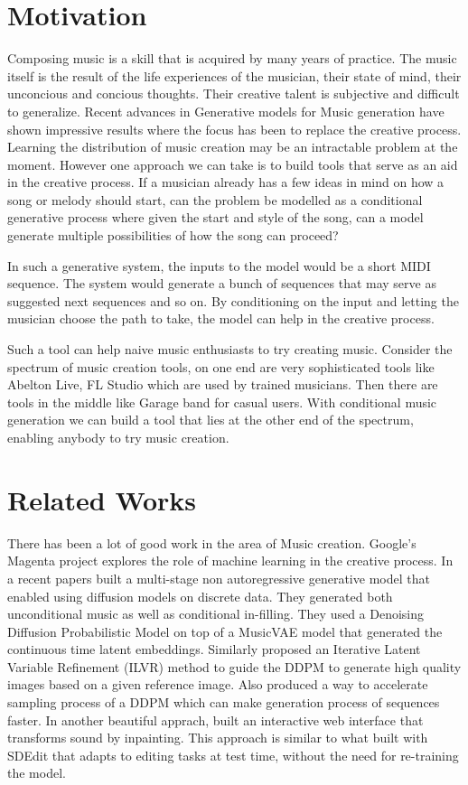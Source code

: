 \documentclass{article}
\begin{document}
\section{Motivation}
\label{submission}
Composing music is a skill that is acquired by many years of practice. The music itself is the result of the life experiences of the musician, their state of mind, their unconcious and concious thoughts. Their creative talent is subjective and difficult to generalize. Recent advances in Generative models for Music generation have shown impressive results where the focus has been to replace the creative process. Learning the distribution of music creation may be an intractable problem at the moment. However one approach we can take is to build tools that serve as an aid in the creative process.  If a musician already has a few ideas in mind on how a song or melody should start, can the problem be modelled as a conditional generative process where given the start and style of the song, can a model generate multiple possibilities of how the song can proceed? 

In such a generative system, the inputs to the model would be a short MIDI sequence. The system would generate a bunch of sequences that may serve as suggested next sequences and so on. By conditioning on the input and letting the musician choose the path to take, the model can help in the creative process.

Such a tool can help naive music enthusiasts to try creating music. Consider the spectrum of music creation tools, on one end are very sophisticated tools like Abelton Live, FL Studio which are used by trained musicians. Then there are tools in the middle like Garage band for casual users. With conditional music generation we can build a tool that lies at the other end of the spectrum, enabling anybody to try music creation.

\section{Related Works}

There has been a lot of good work in the area of Music creation. Google's Magenta project explores the role of machine learning in the creative process. In a recent papers \citep{mittal} built a multi-stage non autoregressive generative model that enabled using diffusion models on discrete data. They generated both unconditional music as well as conditional in-filling. They used a Denoising Diffusion Probabilistic Model \cite{ho2020denoising} on top of a MusicVAE model that generated the continuous time latent embeddings. Similarly \cite{choi2021ilvr} proposed an Iterative Latent Variable Refinement (ILVR) method to guide the DDPM to generate high quality images based on a given reference image. Also \cite{song2020denoising}  produced a way to accelerate sampling process of a DDPM which can make generation process of sequences faster. In another beautiful apprach, \cite{bazin2021} built an interactive web interface that transforms sound by inpainting. This approach is similar to what \cite{meng2021sdedit} built with SDEdit that adapts to editing tasks at test time, without the need for re-training the model.
\end{document}
